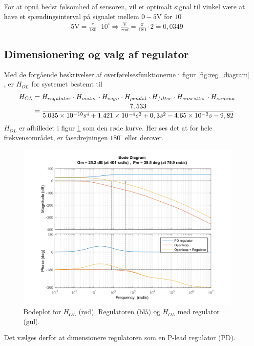 For at opnå bedst følsomhed af sensoren, vil et optimalt signal til vinkel være at have et spændingsinterval på signalet mellem $0-5\si{\volt}$ for $10^{\circ}$ 
\begin{align}
5\si{\volt} = \frac{\pi}{180} \cdot 10^{\circ} \Rightarrow \frac{\si{\volt}}{rad} = \frac{\pi}{180} \cdot 2 = 0,0349
\end{align}


\subsection{Dimensionering og valg af regulator}
Med de forgående beskrivelser af overførelsesfunktionerne i figur \ref{fig:reg_diagram} , er $H_{OL}$ for systemet bestemt til
\begin{align}
H_{OL} &= H_{regulator} \cdot H_{motor} \cdot H_{vogn} \cdot H_{pendul} \cdot H_{filter} \cdot H_{ensretter} \cdot H_{summa} \\
&= \frac{7,533}{\num{5.035e-10} s^4 + \num{1.421E-4} s^3 + 0,3 s^2 - \num{4.65E-3 }s - 9,82}
\end{align} 
$H_{OL}$ er afbilledet i figur \ref{fig:reg_bode_all} som den røde kurve.
Her ses det at for hele frekvensområdet, er fasedrejningen $180^{\circ}$ eller derover.
\begin{figure}[h!]
	\centering
	\includegraphics[width=1\textwidth]{billeder/reg_bode_all.png}
	\caption{Bodeplot for $H_{OL}$ (rød), Regulatoren (blå) og $H_{OL}$ med regulator (gul).}
	\label{fig:reg_bode_all}
\end{figure}
\FloatBlock 
Det vælges derfor at dimensionere regulatoren som en P-lead regulator (PD).
